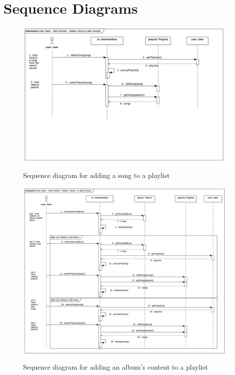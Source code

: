 \documentclass[12pt]{article}
\begin{document}
	\section{Sequence Diagrams}
	\begin{figure}[H]
		\centering
		\includegraphics[scale=0.35]{UseCaseAddSong.png}
		\caption{Sequence diagram for adding a song to a playlist}
		\label{fig:sequenceSong}
	\end{figure}
	\begin{figure}[H]
		\centering
		\includegraphics[scale=0.35]{UseCaseAddAlbum.png}
		\caption{Sequence diagram for adding an album's content to a playlist}
		\label{fig:sequenceAlbum}
	\end{figure}
\end{document}
